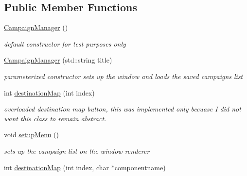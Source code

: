\subsection*{Public Member Functions}
\begin{DoxyCompactItemize}
\item 
\hypertarget{class_campaign_manager_ae7104fc8759da102cfcb9cf2ab37304b}{}\label{class_campaign_manager_ae7104fc8759da102cfcb9cf2ab37304b} 
\hyperlink{class_campaign_manager_ae7104fc8759da102cfcb9cf2ab37304b}{Campaign\+Manager} ()
\begin{DoxyCompactList}\small\item\em default constructor for test purposes only \end{DoxyCompactList}\item 
\hypertarget{class_campaign_manager_aa40b9cbb3806338f2e595f9c2ec8f40e}{}\label{class_campaign_manager_aa40b9cbb3806338f2e595f9c2ec8f40e} 
\hyperlink{class_campaign_manager_aa40b9cbb3806338f2e595f9c2ec8f40e}{Campaign\+Manager} (std\+::string title)
\begin{DoxyCompactList}\small\item\em parameterized constructor sets up the window and loads the saved campaigns list \end{DoxyCompactList}\item 
\hypertarget{class_campaign_manager_ada53db03822cc081fd2e82a82edcafe8}{}\label{class_campaign_manager_ada53db03822cc081fd2e82a82edcafe8} 
int \hyperlink{class_campaign_manager_ada53db03822cc081fd2e82a82edcafe8}{destination\+Map} (int index)
\begin{DoxyCompactList}\small\item\em overloaded destination map button, this was implemented only becuase I did not want this class to remain abstract. \end{DoxyCompactList}\item 
\hypertarget{class_campaign_manager_aaa641bbb75b65d6c74c4f9d196bcdbc8}{}\label{class_campaign_manager_aaa641bbb75b65d6c74c4f9d196bcdbc8} 
void \hyperlink{class_campaign_manager_aaa641bbb75b65d6c74c4f9d196bcdbc8}{setup\+Menu} ()
\begin{DoxyCompactList}\small\item\em sets up the campaign list on the window renderer \end{DoxyCompactList}\item 
int \hyperlink{class_campaign_manager_af4ec02e5399f2a7bea50454eedd4ea62}{destination\+Map} (int index, char $\ast$componentname)
\item 

\end{DoxyCompactItemize}
